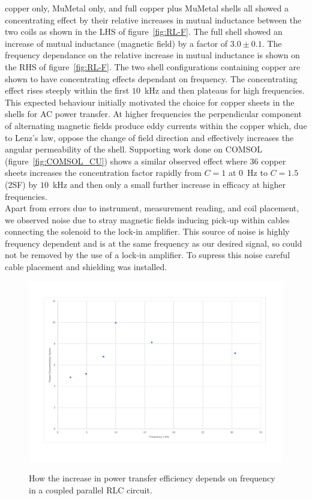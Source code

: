 \documentclass[11pt]{iopart}
\begin{document}
copper only, MuMetal only, and full copper plus MuMetal shells all
showed a concentrating effect by their relative increases in mutual
inductance between the two coils as shown in the LHS of
figure~\ref{fig:RL-F}. The full shell showed an increase of mutual inductance (magnetic field) by
a factor of $3.0\pm0.1$. The frequency
dependance on the relative increase in mutual inductance is shown on
the RHS of figure~\ref{fig:RL-F}. The two shell configurations
containing copper are shown to have concentrating effects dependant on
frequency. The concentrating effect rises steeply within the first
$10$~kHz and then plateaus for high frequencies.
This expected behaviour initially motivated the choice for copper sheets in the
shells for AC power transfer. At higher frequencies the perpendicular
component of alternating magnetic fields produce eddy currents within
the copper which, due to Lenz's law, oppose the change of field
direction and effectively increases the angular permeability of the
shell.  Supporting work done on COMSOL (figure~\ref{fig:COMSOL_CU})
shows a similar observed effect where 36 copper sheets increases the
concentration factor rapidly from $C = 1$ at $0$~Hz to $C = 1.5$ (2SF)
by $10$~kHz and then only a small further increase in efficacy at higher
frequencies.\\
Apart from errors due to instrument, measurement reading, and coil
placement, we observed noise due to stray magnetic fields inducing
pick-up within cables connecting the solenoid to the lock-in
amplifier. This source of noise is highly frequency dependent and is
at the same frequency as our desired signal, so could not be removed by
the use of a lock-in amplifier. To supress this noise careful cable
placement and shielding was installed. \\

\begin{figure}
  \begin{center}
   \noindent\includegraphics[width=0.75\linewidth]{images/RLC-P.pdf}
  \label{fig:RLC-P}
  \end{center}
  \caption{How the increase in power transfer efficiency depends on
    frequency in a coupled parallel RLC circuit.}
\end{figure}
\end{document}
